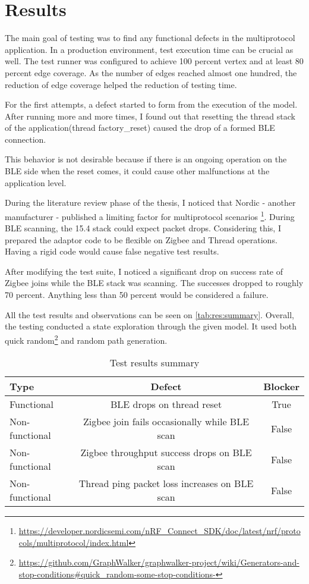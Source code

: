 \chapter{Results}
\label{chap:results}
The main goal of testing was to find any functional defects in the multiprotocol application. In a production environment, test execution time can be crucial as well. The test runner was configured to achieve 100 percent vertex and at least 80 percent edge coverage. As the number of edges reached almost one hundred, the reduction of edge coverage helped the reduction of testing time.


For the first attempts, a defect started to form from the execution of the model. After running more and more times, I found out that resetting the thread stack of the application(thread factory\_reset) caused the drop of a formed BLE connection.


This behavior is not desirable because if there is an ongoing operation on the BLE side when the reset comes, it could cause other malfunctions at the application level.


During the literature review phase of the thesis, I noticed that Nordic - another manufacturer - published a limiting factor for multiprotocol scenarios \footnote{\url{https://developer.nordicsemi.com/nRF_Connect_SDK/doc/latest/nrf/protocols/multiprotocol/index.html}}.
During BLE scanning, the 15.4 stack could expect packet drops.
Considering this, I prepared the adaptor code to be flexible on Zigbee and Thread operations. Having a rigid code would cause false negative test results.


After modifying the test suite, I noticed a significant drop on success rate of Zigbee joins while the BLE stack was scanning.
The successes dropped to roughly 70 percent.
Anything less than 50 percent would be considered a failure.

All the test results and observations can be seen on \autoref{tab:res:summary}.
Overall, the testing conducted a state exploration through the given model.
It used both quick random\footnote{\url{https://github.com/GraphWalker/graphwalker-project/wiki/Generators-and-stop-conditions\#quick_random-some-stop-conditions-}} and random path generation.

\begin{table}
    \centering
    \begin{tabular}{ l c c }
        \toprule
        Type           & Defect                                        & Blocker \\
        \midrule
        Functional     & BLE drops on thread reset                     & True    \\
        Non-functional & Zigbee join fails occasionally while BLE scan & False   \\
        Non-functional & Zigbee throughput success drops on BLE scan   & False   \\
        Non-functional & Thread ping packet loss increases on BLE scan & False   \\
        \bottomrule
    \end{tabular}
    \caption{Test results summary}
    \label{tab:res:summary}
\end{table}

